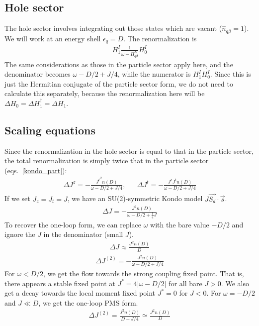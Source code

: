 \documentclass[12pt]{revtex4-2}
\begin{document}
\subsection{Hole sector}
The hole sector involves integrating out those states which are vacant (\(\hat n_{q\beta}=1\)). We will work at an energy  shell \(\epsilon_q = D\). The renormalization is
\begin{align}
	H^I_1 \frac{1}{\omega - H^D_{q\beta}} H^I_0
\end{align}
The same considerations as those in the particle sector apply here, and the denominator becomes \(\omega - D/2 + J/4\), while the numerator is \(H^I_1 H^I_0\). Since this is just the Hermitian conjugate of the particle sector form, we do not need to calculate this separately, because the renormalization here will be \(\Delta H_0 = \Delta H_1^\dagger = \Delta H_1\).

\subsection{Scaling equations}
Since the renormalization in the hole sector is equal to that in the particle sector, the total renormalization is simply twice that in the particle sector (eqs.~\ref{kondo_part}):
\begin{align}
	\Delta J^z = -\frac{{J^t}^2n(D)}{\omega - D/2 + J/4}, && \Delta J^t = -\frac{J^z J^tn(D)}{\omega - D/2 + J/4}
\end{align}
If we set \(J_z = J_t = J\), we have an SU(2)-symmetric Kondo model \(J \vec{S_d}\cdot\vec{s}\).
\begin{align}
	\label{kondosym}
	\Delta J = - \frac{J^2 n(D)}{\omega - D/2 + \frac{1}{4}J}
\end{align}
To recover the one-loop form, we can replace \(\omega\) with the bare value \(-D/2\) and ignore the \(J\) in the denominator (small \(J\)).
\begin{align}
	\Delta J \approx \frac{J^2 n(D)}{D}
\end{align}
\begin{align}
	\Delta J^{(2)} = -\frac{J^2 n(D)}{\omega - D/2 + J/4}
\end{align}
For \(\omega < D/2\), we get the flow towards the strong coupling fixed point. That is, there appears a stable fixed point at \(J^* = 4|\omega - D/2|\) for all bare \(J > 0\). We also get a decay towards the local moment fixed point \(J^* = 0\) for \(J < 0\). For \(\omega = -D/2\) and \(J \ll D\), we get the one-loop PMS form. 
\begin{align}
	\Delta J^{(2)} = \frac{J^2 n(D)}{D - J/4} \simeq \frac{J^2 n(D)}{D}
\end{align}
\end{document}
